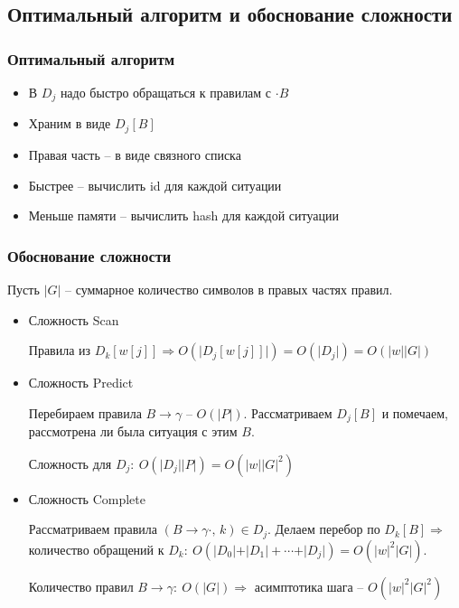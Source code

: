\documentclass[a4paper,12pt]{article}
\theoremstyle{plain}
\theoremstyle{definition}
\theoremstyle{remark}
\begin{document}
\subsection{Оптимальный алгоритм и обоснование сложности}
\subsubsection*{Оптимальный алгоритм}
\begin{itemize}
	\item В $D_j$ надо быстро обращаться к правилам с $\cdot B$
	\item Храним в виде $D_j[B]$
	\item Правая часть -- в виде связного списка
	\item Быстрее -- вычислить id для каждой ситуации
	\item Меньше памяти -- вычислить hash для каждой ситуации
\end{itemize}

\subsubsection*{Обоснование сложности}
Пусть $\vert G\vert$ -- суммарное количество символов в правых частях правил.

\begin{itemize}
	\item Сложность Scan

	      Правила из $D_k[w[j]] \Rightarrow O(\vert D_j[w[j]]\vert) = O(\vert D_j\vert) = O(\vert w\vert\vert G\vert)$

	\item Сложность Predict

	      Перебираем правила $B \to \gamma$ -- $O(\vert P\vert)$. Рассматриваем $D_j[B]$ и помечаем, рассмотрена ли была ситуация с этим $B$.

	      Сложность для $D_j :\: O(\vert D_j\vert\vert P\vert) = O(\vert w\vert\vert G\vert^2)$
	\item Сложность Complete

	      Рассматриваем правила $(B \to \gamma\cdot,\, k) \in D_j$. Делаем перебор по $D_k[B] \Rightarrow$ количество обращений к $D_k :\: O(\vert D_0\vert + \vert D_1\vert + \cdots + \vert D_j\vert) = O(\vert w\vert^2\vert G\vert)$.

	      Количество правил $B \to \gamma:\: O(\vert G\vert) \Rightarrow$ асимптотика шага -- $O(\vert w\vert^2\vert G\vert^2)$
\end{itemize}
\end{document}
